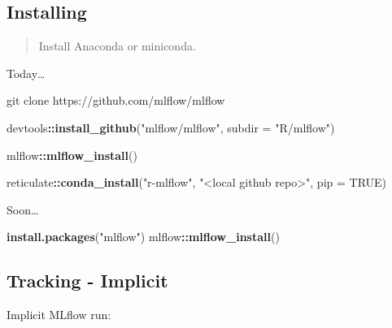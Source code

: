 \documentclass[]{article}
\newenvironment{Shaded}{\begin{snugshade}}{\end{snugshade}}
\newcommand{\DataTypeTok}[1]{\textcolor[rgb]{0.13,0.29,0.53}{#1}}
\newcommand{\FunctionTok}[1]{\textcolor[rgb]{0.00,0.00,0.00}{#1}}
\newcommand{\KeywordTok}[1]{\textcolor[rgb]{0.13,0.29,0.53}{\textbf{#1}}}
\newcommand{\NormalTok}[1]{#1}
\newcommand{\OperatorTok}[1]{\textcolor[rgb]{0.81,0.36,0.00}{\textbf{#1}}}
\newcommand{\OtherTok}[1]{\textcolor[rgb]{0.56,0.35,0.01}{#1}}
\newcommand{\StringTok}[1]{\textcolor[rgb]{0.31,0.60,0.02}{#1}}
\begin{document}
\hypertarget{installing}{%
\subsection{Installing}\label{installing}}

\begin{quote}
Install Anaconda or miniconda.
\end{quote}

Today\ldots{}

\begin{Shaded}
\begin{Highlighting}[]
\FunctionTok{git}\NormalTok{ clone https://github.com/mlflow/mlflow}
\end{Highlighting}
\end{Shaded}

\begin{Shaded}
\begin{Highlighting}[]
\NormalTok{devtools}\OperatorTok{::}\KeywordTok{install_github}\NormalTok{(}\StringTok{"mlflow/mlflow"}\NormalTok{, }\DataTypeTok{subdir =} \StringTok{"R/mlflow"}\NormalTok{)}

\NormalTok{mlflow}\OperatorTok{::}\KeywordTok{mlflow_install}\NormalTok{()}

\NormalTok{reticulate}\OperatorTok{::}\KeywordTok{conda_install}\NormalTok{(}\StringTok{"r-mlflow"}\NormalTok{, }\StringTok{"<local github repo>"}\NormalTok{, }\DataTypeTok{pip =} \OtherTok{TRUE}\NormalTok{)}
\end{Highlighting}
\end{Shaded}

Soon\ldots{}

\begin{Shaded}
\begin{Highlighting}[]
\KeywordTok{install.packages}\NormalTok{(}\StringTok{"mlflow"}\NormalTok{)}
\NormalTok{mlflow}\OperatorTok{::}\KeywordTok{mlflow_install}\NormalTok{()}
\end{Highlighting}
\end{Shaded}

\hypertarget{tracking---implicit}{%
\subsection{Tracking - Implicit}\label{tracking---implicit}}

Implicit MLflow run:
\end{document}
